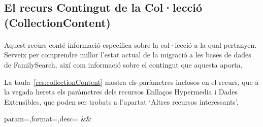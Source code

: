 \subsection{El recurs Contingut de la Col·lecció (CollectionContent)}

    \paragraph{}
    Aquest recurs conté informació específica sobre la col·lecció a la qual pertanyen. Serveix per comprendre millor l'estat actual de la migració a les bases de dades de FamilySearch, així com informació sobre el contingut que aquesta aporta.

    La taula~\ref{res:collectionContent} mostra els paràmetres inclosos en el recurs, que a la vegada hereta els paràmetres dels recursos Enllaços Hypermedia i Dades Extensibles, que poden ser trobats a l'apartat `Altres recursos interessants'.

    \begin{center}
             {param=\param,format=\format,desc=\desc}
             {\param&\format&\desc}
     \end{center}

